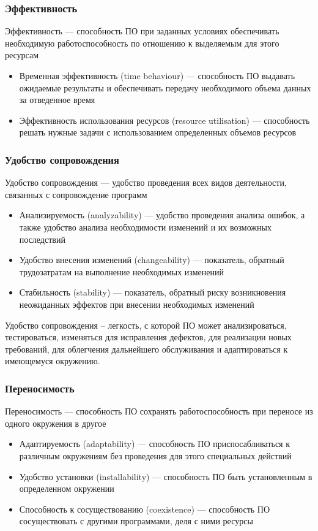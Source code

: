 \documentclass{../industrial-development}
\begin{document}
	\begin{frame} \frametitle {Эффективность}
		\begin{block}{}
			\alert{Эффективность} --- способность ПО при заданных условиях обеспечивать необходимую работоспособность по отношению к выделяемым для этого ресурсам
		\end{block}
		\begin{itemize}
			\item Временная эффективность (time behaviour) --- способность ПО выдавать ожидаемые результаты и обеспечивать передачу необходимого объема данных за отведенное время
			\item Эффективность использования ресурсов (resource utilisation) --- способность решать нужные задачи с использованием определенных объемов ресурсов
		\end{itemize}
	\end{frame}
	
	\begin{frame} \frametitle {Удобство сопровождения}
		\begin{block}{}
			\alert{Удобство сопровождения} --- удобство проведения всех видов деятельности, связанных с сопровождение программ
		\end{block}
		\begin{itemize}
			\item Анализируемость (analyzability) --- удобство проведения анализа ошибок, а также удобство анализа необходимости изменений и их возможных последствий
			\item Удобство внесения изменений (changeability) --- показатель, обратный трудозатратам на выполнение необходимых изменений
			\item Стабильность (stability) --- показатель, обратный риску возникновения неожиданных эффектов при внесении необходимых изменений
		\end{itemize}
	\end{frame}	
	\lecturenotes Удобство сопровождения – легкость, с которой ПО может анализироваться, тестироваться, изменяться для исправления дефектов, для реализации новых требований, для облегчения дальнейшего обслуживания и адаптироваться к имеющемуся окружению.
	
	\begin{frame} \frametitle {Переносимость}
		\begin{block}{}
			\alert{Переносимость} --- способность ПО сохранять работоспособность при переносе из одного окружения в другое
		\end{block}
		\begin{itemize}
			\item Адаптируемость (adaptability) --- способность ПО приспосабливаться к различным окружениям без проведения для этого специальных действий
			\item Удобство установки (installability) --- способность ПО быть установленным в определенном окружении
			\item Способность к сосуществованию (coexistence) --- способность ПО сосуществовать с другими программами, деля с ними ресурсы
		\end{itemize}
	\end{frame}	
	
\end{document}
